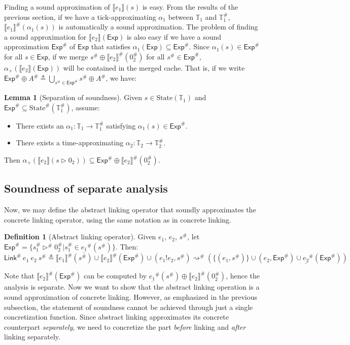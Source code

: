 \documentclass[acmsmall,review]{acmart}\settopmatter{printfolios=true,printccs=false,printacmref=false}
\theoremstyle{definition}
\newtheorem{definition}{Definition}[section]
\newtheorem{lem}{Lemma}[section]
\newcommand*{\A}[1]{{#1}^{\#}}
\newcommand*{\Time}{\mathbb{T}}
\newcommand*{\ATime}{\A{\Time}}
\newcommand*{\State}[1]{\text{State}({#1})}
\newcommand*{\AState}[1]{\A{\text{State}}({#1})}
\newcommand*{\link}[2]{{#1}\mathtt{!}{#2}}
\newcommand*{\Exp}{\mathsf{Exp}}
\newcommand*{\Link}{\mathsf{Link}}
\newcommand*{\sembracket}[1]{\lBrack{#1}\rBrack}
\begin{document}
Finding a sound approximation of $\sembracket{e_1}(s)$ is easy.
From the results of the previous section, if we have a tick-approximating $\alpha_1$ between $\Time_1$ and $\ATime_1$, $\A{\sembracket{e_1}}(\alpha_1(s))$ is automatically a sound approximation.
The problem of finding a sound approximation for $\sembracket{e_2}(\Exp)$ is also easy if we have a sound approximation $\A\Exp$ of $\Exp$ that satisfies $\alpha_1(\Exp)\subseteq\A\Exp$.
Since $\alpha_1(s)\in\A\Exp$ for all $s\in\Exp$, if we merge $\A{s}\oplus\A{\sembracket{e_2}}(\A{0}_2)$ for all $\A{s}\in\A\Exp$, $\alpha_+(\sembracket{e_2}(\Exp))$ will be contained in the merged cache.
That is, if we write $\A{\Exp}\oplus\A{A}\triangleq\bigcup_{\A{s}\in\A\Exp}\A{s}\oplus\A{A}$, we have:
\begin{lem}[Separation of soundness]
  Given $s\in\State{\Time_1}$ and $\A\Exp\subseteq\AState{\ATime_1}$, assume:
  \begin{itemize}
    \item There exists an $\alpha_1:\Time_1\rightarrow\ATime_1$ satisfying $\alpha_1(s)\in\A{\Exp}$.
    \item There exists a time-approximating $\alpha_2:\Time_2\rightarrow\ATime_2$.
  \end{itemize}

  Then $\alpha_+(\sembracket{e_2}(s\rhd0_2))\subseteq\A\Exp\oplus\A{\sembracket{e_2}}(\A{0}_2)$.
\end{lem}

\subsection{Soundness of separate analysis}
Now, we may define the abstract linking operator that soundly approximates the concrete linking operator, using the same notation as in concrete linking.
\begin{definition}[Abstract linking operator]
  Given $e_1$, $e_2$, $\A{s}$, let $\A\Exp=\{\A{s}_1\A\rhd\A{0}_2|\A{s}_1\in\A{\underline{e_1}}(\A{s})\}$. Then:
  \[\A\Link\:e_1\:e_2\:\A{s}\triangleq\A{\sembracket{e_1}}(\A{s})\cup\A{\sembracket{e_2}}(\A\Exp)\cup(\link{e_1}{e_2},\A{s})\A\rightsquigarrow(\{(e_1,\A{s})\}\cup(e_2,\A\Exp)\cup\A{\underline{e_2}}(\A\Exp))\]
\end{definition}
Note that $\A{\sembracket{e_2}}(\A\Exp)$ can be computed by $\A{\underline{e_1}}(\A{s})\oplus\A{\sembracket{e_2}}(\A{0}_2)$, hence the analysis is separate.
Now we want to show that the abstract linking operation is a sound approximation of concrete linking.
However, as emphasized in the previous subsection, the statement of soundness cannot be achieved through just a single concretization function.
Since abstract linking approximates its concrete counterpart \emph{separately}, we need to concretize the part \emph{before} linking and \emph{after} linking separately.
\end{document}
